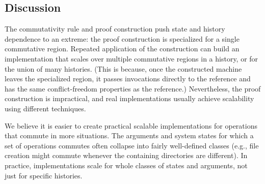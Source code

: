 \begin{comment}
\caption{\textbf{(a)} A serial, single-threaded history. Each invocation (filled
  circle) is immediately followed by its response (open circle).
%
  \textbf{(b)} A three-thread history. Colors indicate different threads.
%
  \textbf{(c)} The thread-restricted subhistories of (b). Each is
  serial.
%
  \textbf{(d)} A three-thread history with a commutative region. The
  commutative region is highlighted.
%
  \textbf{(e)} Three interleavings of the commutative region.
%
  \protect\XXX[E]{This figure is currently unreferenced, leaving it in case
  others think it useful.}~
}
\end{figure*}
\end{comment}

\subsection{Discussion}

The commutativity rule and proof construction push state and
history dependence to an extreme: the proof construction is specialized
for a single commutative region.
%
Repeated application of the construction can build an
implementation that scales over multiple commutative regions in a
history, or for the union of many histories.
%
(This is because, once the constructed machine leaves the specialized
region, it passes invocations directly to the reference and has
the same conflict-freedom properties as the reference.)
%
Nevertheless, the proof construction is impractical, and real
implementations usually achieve scalability using different techniques.

We believe it is easier to create practical scalable implementations for
operations that commute in more situations.
%
The arguments and system states for which a set of operations
commutes often collapse into
fairly well-defined classes (e.g., file creation might
commute whenever the containing directories are different).
%
In practice, implementations scale for whole classes of states and
arguments, not just for specific histories.

